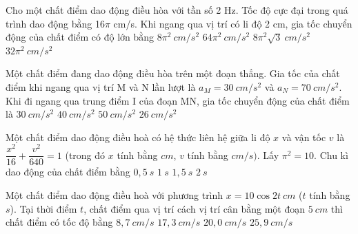 \begin{ex} %
Cho một chất điểm dao động điều hòa với tần số 2 Hz. Tốc độ cực đại trong quá trình dao động bằng 16$\pi$ cm/s. Khi ngang qua vị trí có li độ 2 cm, gia tốc chuyển động của chất điểm có độ lớn bằng
\choice
{$8\pi^2\ cm/s^2$}
{$64\pi^2\ cm/s^2$}
{$8\pi^2\sqrt{3}\ cm/s^2$}
{\True $32\pi^2\ cm/s^2$}

\end{ex} 
\begin{ex} %
Một chất điểm đang dao động điều hòa trên một đoạn thẳng. Gia tốc của chất điểm khi ngang qua vị trí M và N lần lượt là $a_M = 30\ cm/s^2$ và $a_N = 70\ cm/s^2$. Khi đi ngang qua trung điểm I của đoạn MN, gia tốc chuyển động của chất điểm là
\choice
{$30\ cm/s^2$}
{$40\ cm/s^2$}
{\True $50\ cm/s^2$}
{$26\ cm/s^2$}
\end{ex} 
\begin{ex}
Một chất điểm dao động điều hoà có hệ thức liên hệ giữa li độ $x$ và vận tốc $v$ là $\dfrac{x^2}{16}+\dfrac{v^2}{640}=1$ (trong đó $x$ tính bằng $cm$, $v$ tính bằng $cm/s)$. Lấy $\pi^2=10$. Chu kì dao động của chất điểm bằng
\choice
{$0,5\ s$}
{\True $1\ s$}
{$1,5\ s$}
{$2\ s$}
\end{ex} 
\begin{ex}
Một chất điểm dao động điều hoà với phương trình $x = 10 \cos 2 t\ cm$ ($t$ tính bằng $s$). Tại thời điểm $t$, chất điểm qua vị trí cách vị trí cân bằng một đoạn $5\ cm$ thì chất điểm có tốc độ bằng
\choice
{$8,7\ cm/s$}
{\True $17,3\ cm/s$}
{$20,0\ cm/s$}
{$25,9\ cm/s$}
\end{ex}
